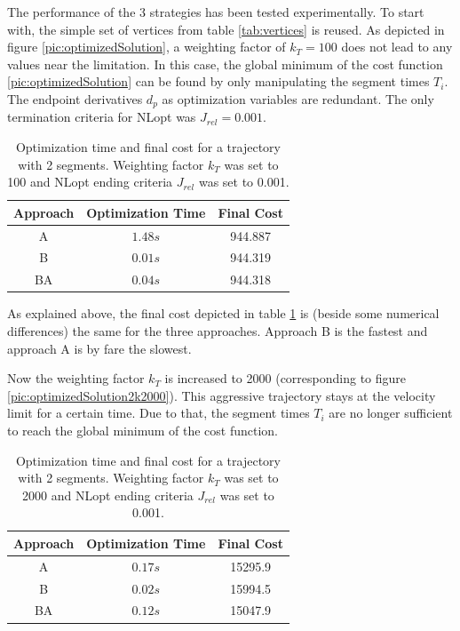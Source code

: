 The performance of the 3 strategies has been tested experimentally.
To start with, the simple set of vertices from table \ref{tab:vertices} is reused. As depicted in figure \ref{pic:optimizedSolution}, a weighting factor of $k_T = 100$ does not lead to any values near the limitation. In this case, the global minimum of the cost function \ref{pic:optimizedSolution} can be found by only manipulating the segment times $T_i$. The endpoint derivatives $d_p$ as optimization variables are redundant. The only termination criteria for NLopt was $J_{rel} = 0.001$.



\begin{table}[H] 
\begin{center}
    \begin{tabular}{| c | c |  c |}
    \hline
    Approach & Optimization Time & Final Cost \\ \hline
  A & $1.48s$ & 944.887 \\ \hline
  B & $0.01s$ & 944.319 \\ \hline
 BA & $0.04s$ & 944.318 \\
    \hline
    \end{tabular}
    \caption{Optimization time and final cost for a trajectory with 2 segments. Weighting factor $k_T$ was set to 100 and NLopt ending criteria $J_{rel}$ was set to 0.001.}
    \label{tab:ABBA1}
\end{center}
\end{table}

As explained above, the final cost depicted in table \ref{tab:ABBA1} is (beside some numerical differences) the same for the three approaches. Approach B is the fastest and approach A is by fare the slowest. \newline

Now the weighting factor $k_T$ is increased to 2000 (corresponding to figure \ref{pic:optimizedSolution2k2000}). This  aggressive trajectory stays at the velocity limit for a certain time. Due to that, the segment times $T_i$ are no longer sufficient to reach the global minimum of the cost function.

\begin{table}[H] 
\begin{center}
    \begin{tabular}{| c | c |  c |}
    \hline
    Approach & Optimization Time & Final Cost \\ \hline
  A & $0.17s$ & 15295.9 \\ \hline
  B & $0.02s$ &  15994.5\\ \hline
 BA & $0.12s$ &  15047.9\\
    \hline
    \end{tabular}
    \caption{Optimization time and final cost for a trajectory with 2 segments. Weighting factor $k_T$ was set to 2000 and NLopt ending criteria $J_{rel}$ was set to 0.001.}
    \label{tab:ABBA2}
\end{center}
\end{table}

